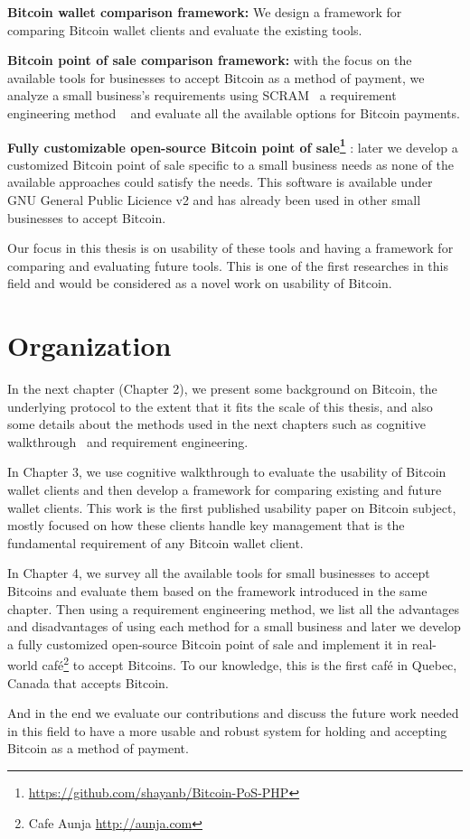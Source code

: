 \textbf{Bitcoin wallet comparison framework:} We design a framework for comparing Bitcoin wallet clients and evaluate the existing tools.

\textbf{Bitcoin point of sale comparison framework: } with the focus on the available tools for businesses to accept Bitcoin as a method of payment, we analyze a small business's requirements using SCRAM~\cite{REScenario} a requirement engineering method ~\cite{dorfman1990system} and evaluate all the available options for Bitcoin payments.

\textbf{Fully customizable open-source Bitcoin point of sale\footnote{\url{https://github.com/shayanb/Bitcoin-PoS-PHP}} }: later we develop a customized Bitcoin point of sale specific to a small business needs as none of the available approaches could satisfy the needs. This software is available under GNU General Public Licience v2 and has already been used in other small businesses to accept Bitcoin.

Our focus in this thesis is on usability of these tools and having a framework for comparing and evaluating future tools. This is one of the first researches in this field and would be considered as a novel work on usability of Bitcoin.

\section{Organization}
In the next chapter (Chapter 2), we present some background on Bitcoin, the underlying protocol to the extent that it fits the scale of this thesis, and also some details about the methods used in the next chapters such as cognitive walkthrough~\cite{WRLP94}  and requirement engineering.

In Chapter 3, we use cognitive walkthrough to evaluate the usability of Bitcoin wallet clients and then develop a framework for comparing existing and future wallet clients. This work is the first published usability paper on Bitcoin subject, mostly focused on how these clients handle key management that is the fundamental requirement of any Bitcoin wallet client.

In Chapter 4, we survey all the available tools for small businesses to accept Bitcoins and evaluate them based on the framework introduced in the same chapter. Then using a requirement engineering method, we list all the advantages and disadvantages of using each method for a small business and later we develop a fully customized open-source Bitcoin point of sale and implement it in real-world café\footnote{ Cafe Aunja \url{http://aunja.com}} to accept Bitcoins. To our knowledge, this is the first café in Quebec, Canada that accepts Bitcoin.

And in the end we evaluate our contributions and discuss the future work needed in this field to have a more usable and robust system for holding and accepting Bitcoin as a method of payment.